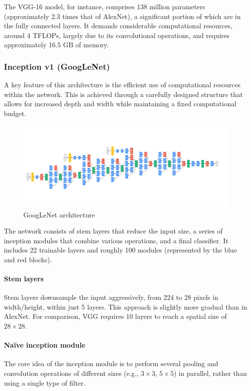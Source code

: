 The VGG-16 model, for instance, comprises 138 million parameters (approximately 2.3 times that of AlexNet), a significant portion of which are in the fully connected layers. It demands considerable computational resources, around 4 TFLOPs, largely due to its convolutional operations, and requires approximately 16.5 GB of memory.

\subsubsection{Inception v1 (GoogLeNet)}
A key feature of this architecture is the efficient use of computational resources within the network. This is achieved through a carefully designed structure that allows for increased depth and width while maintaining a fixed computational budget.

\begin{figure}[htbp]
  \centering
  \includegraphics[width=0.99\linewidth]{./img/googlenet.png}
  \caption{GoogLeNet architecture}
\end{figure}

The network consists of stem layers that reduce the input size, a series of inception modules that combine various operations, and a final classifier. It includes 22 trainable layers and roughly 100 modules (represented by the blue and red blocks).

\paragraph{Stem layers}
Stem layers downsample the input aggressively, from 224 to 28 pixels in width/height, within just 5 layers. This approach is slightly more gradual than in AlexNet. For comparison, VGG requires 10 layers to reach a spatial size of $28\times 28$.

\paragraph{Naïve inception module}
The core idea of the inception module is to perform several pooling and convolution operations of different sizes (e.g., $3\times 3$, $5\times 5$) in parallel, rather than using a single type of filter.


